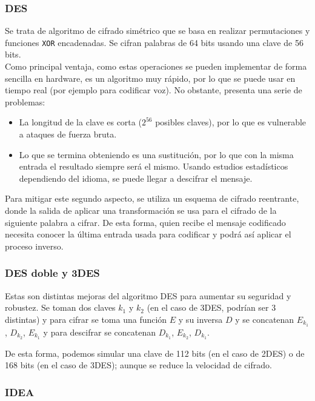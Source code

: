 \subsubsection{\acrfull{DES}}
Se trata de algoritmo de cifrado simétrico que se basa en realizar permutaciones y funciones \verb|XOR| encadenadas. Se cifran palabras de 64 bits usando una clave de 56 bits.\\

Como principal ventaja, como estas operaciones se pueden implementar de forma sencilla en hardware, es un algoritmo muy rápido, por lo que se puede usar en tiempo real (por ejemplo para codificar voz). No obstante, presenta una serie de problemas:
\begin{itemize}
    \item La longitud de la clave es corta ($2^{56}$ posibles claves), por lo que es vulnerable a ataques de fuerza bruta.
    \item Lo que se termina obteniendo es una sustitución, por lo que con la misma entrada el resultado siempre será el mismo. Usando estudios estadísticos dependiendo del idioma, se puede llegar a descifrar el mensaje.
\end{itemize}

Para mitigar este segundo aspecto, se utiliza un esquema de cifrado reentrante, donde la salida de aplicar una transformación se usa para el cifrado de la siguiente palabra a cifrar. De esta forma, quien recibe el mensaje codificado necesita conocer la última entrada usada para codificar y podrá así aplicar el proceso inverso.

\subsubsection{\acrshort{DES} doble y 3\acrshort{DES}}

Estas son distintas mejoras del algoritmo \acrshort{DES} para aumentar su seguridad y robustez. Se toman dos claves $k_1$ y $k_2$ (en el caso de 3\acrshort{DES}, podrían ser 3 distintas) y para cifrar se toma una función $E$ y su inversa $D$ y se concatenan $E_{k_1}$, $D_{k_2}$, $E_{k_1}$ y para descifrar se concatenan $D_{k_1}$, $E_{k_2}$, $D_{k_1}$.

De esta forma, podemos simular una clave de 112 bits (en el caso de 2\acrshort{DES}) o de 168 bits (en el caso de 3\acrshort{DES}); aunque se reduce la velocidad de cifrado.
\subsubsection{\acrfull{IDEA}}

